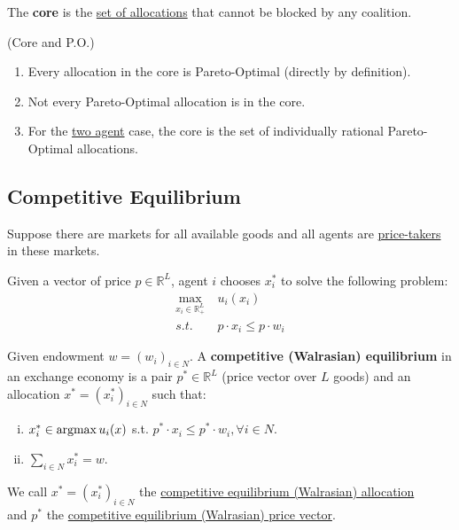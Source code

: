 \documentclass[11pt]{elegantbook}
\newcommand{\argmax}{\operatornamewithlimits{argmax}}
\begin{document}
\begin{definition}[Core]
    \normalfont
    The \textbf{core} is the \underline{set of allocations} that cannot be blocked by any coalition.
\end{definition}

\begin{note}(Core and P.O.)
    \begin{enumerate}[$\circ$]
        \item Every allocation in the core is Pareto-Optimal (directly by definition).
        \item Not every Pareto-Optimal allocation is in the core.
        \item For the \underline{two agent} case, the core is the set of individually rational Pareto-Optimal allocations.
    \end{enumerate}
\end{note}




\subsection{Competitive Equilibrium}
\begin{assumption}
    \normalfont
    Suppose there are markets for all available goods and all agents are \underline{price-takers} in these markets.
\end{assumption}
Given a vector of price $p\in \mathbb{R}^L$, agent $i$ chooses $x_i^*$ to solve the following problem:
\begin{equation}
    \begin{aligned}
        \max_{x_i\in \mathbb{R}^L_+}\ & u_i(x_i)\\
        s.t.\ & p\cdot x_i\leq p\cdot w_i
    \end{aligned}
    \nonumber
\end{equation}



\begin{definition}
    \normalfont
    Given endowment $w=(w_i)_{i\in N}$. A \textbf{competitive (Walrasian) equilibrium} in an exchange economy is a pair $p^*\in \mathbb{R}^L$ (price vector over $L$ goods) and an allocation $x^*=(x^*_i)_{i\in N}$ such that:
    \begin{enumerate}[(i).]
        \item $x_i^*\in \argmax u_i(x)$ s.t. $p^*\cdot x_i\leq p^*\cdot w_i, \forall i\in N$.
        \item $\sum_{i\in N}x_i^*=w$.
    \end{enumerate}
    We call $x^*=(x^*_i)_{i\in N}$ the \underline{competitive equilibrium (Walrasian) allocation}\\ and $p^*$ the \underline{competitive equilibrium (Walrasian) price vector}.
\end{definition}
\end{document}
